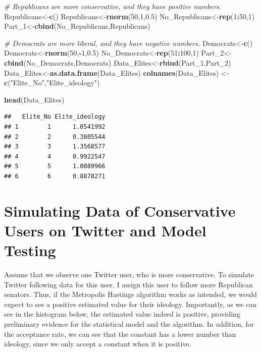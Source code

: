 \documentclass[]{book}
\newenvironment{Shaded}{\begin{snugshade}}{\end{snugshade}}
\newcommand{\KeywordTok}[1]{\textcolor[rgb]{0.13,0.29,0.53}{\textbf{#1}}}
\newcommand{\DecValTok}[1]{\textcolor[rgb]{0.00,0.00,0.81}{#1}}
\newcommand{\FloatTok}[1]{\textcolor[rgb]{0.00,0.00,0.81}{#1}}
\newcommand{\StringTok}[1]{\textcolor[rgb]{0.31,0.60,0.02}{#1}}
\newcommand{\CommentTok}[1]{\textcolor[rgb]{0.56,0.35,0.01}{\textit{#1}}}
\newcommand{\OperatorTok}[1]{\textcolor[rgb]{0.81,0.36,0.00}{\textbf{#1}}}
\newcommand{\NormalTok}[1]{#1}
\begin{document}
\begin{Shaded}
\begin{Highlighting}[]
\CommentTok{# Republicans are more conservative, and they have positive numbers.}
\NormalTok{Republicans<-}\KeywordTok{c}\NormalTok{()}
\NormalTok{Republicans<-}\KeywordTok{rnorm}\NormalTok{(}\DecValTok{50}\NormalTok{,}\DecValTok{1}\NormalTok{,}\FloatTok{0.5}\NormalTok{)}
\NormalTok{No_Republicans<-}\KeywordTok{rep}\NormalTok{(}\DecValTok{1}\OperatorTok{:}\DecValTok{50}\NormalTok{,}\DecValTok{1}\NormalTok{)}
\NormalTok{Part_}\DecValTok{1}\NormalTok{<-}\KeywordTok{cbind}\NormalTok{(No_Republicans,Republicans)}

\CommentTok{# Democrats are more liberal, and they have negative numbers.}
\NormalTok{Democrats<-}\KeywordTok{c}\NormalTok{()}
\NormalTok{Democrats<-}\KeywordTok{rnorm}\NormalTok{(}\DecValTok{50}\NormalTok{,}\OperatorTok{-}\DecValTok{1}\NormalTok{,}\FloatTok{0.5}\NormalTok{)}
\NormalTok{No_Democrats<-}\KeywordTok{rep}\NormalTok{(}\DecValTok{51}\OperatorTok{:}\DecValTok{100}\NormalTok{,}\DecValTok{1}\NormalTok{)}
\NormalTok{Part_}\DecValTok{2}\NormalTok{<-}\KeywordTok{cbind}\NormalTok{(No_Democrats,Democrats)}
\NormalTok{Data_Elites<-}\KeywordTok{rbind}\NormalTok{(Part_}\DecValTok{1}\NormalTok{,Part_}\DecValTok{2}\NormalTok{)}
\NormalTok{Data_Elites<-}\KeywordTok{as.data.frame}\NormalTok{(Data_Elites)}
\KeywordTok{colnames}\NormalTok{(Data_Elites) <-}\StringTok{ }\KeywordTok{c}\NormalTok{(}\StringTok{"Elite_No"}\NormalTok{,}\StringTok{"Elite_ideology"}\NormalTok{)}

\KeywordTok{head}\NormalTok{(Data_Elites)}
\end{Highlighting}
\end{Shaded}

\begin{verbatim}
##   Elite_No Elite_ideology
## 1        1      1.0541992
## 2        2      0.3805544
## 3        3      1.3568577
## 4        4      0.9922547
## 5        5      1.0089966
## 6        6      0.8878271
\end{verbatim}

\section{Simulating Data of Conservative Users on Twitter and Model
Testing}\label{simulating-data-of-conservative-users-on-twitter-and-model-testing}

Assume that we observe one Twitter user, who is more conservative. To
simulate Twitter following data for this user, I assign this user to
follow more Republican senators. Thus, if the Metropolis Hastings
algorithm works as intended, we would expect to see a positive estimated
value for their ideology. Importantly, as we can see in the histogram
below, the estimated value indeed is positive, providing preliminary
evidence for the statistical model and the algorithm. In addition, for
the acceptance rate, we can see that the constant has a lower number
than ideology, since we only accept a constant when it is positive.
\end{document}
